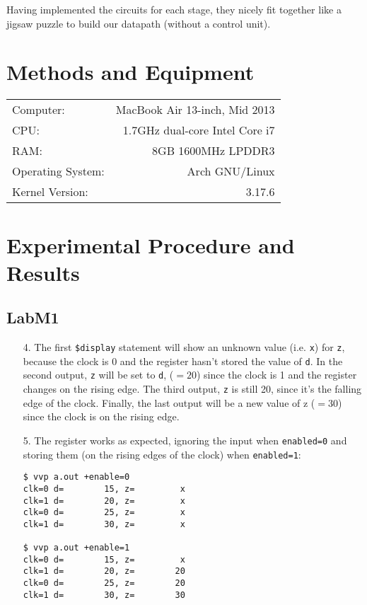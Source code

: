 \documentclass{article}
\begin{document}
Having implemented the circuits for each stage, they nicely fit together like a jigsaw
puzzle to build our datapath (without a control unit).


\section{Methods and Equipment}

\begin{center}
\begin{tabular}{l r}
Computer: & MacBook Air 13-inch, Mid 2013 \\
CPU: & 1.7GHz dual-core Intel Core i7 \\
RAM: & 8GB 1600MHz LPDDR3 \\
Operating System: & Arch GNU/Linux \\
Kernel Version: & 3.17.6
\end{tabular}
\end{center}


\section{Experimental Procedure and Results}

\subsection{LabM1}
\begin{enumerate}
\item[4. ] The first \verb#$display# statement will show an unknown value
(i.e. \verb$x$) for \verb$z$, because the clock is 0 and the register hasn't
stored the value of \verb$d$. In the second output, \verb$z$ will be set to
\verb$d$, ($= 20$) since the clock is 1 and the register changes on the rising
edge. The third output, \verb$z$ is still 20, since it's the falling edge of the
clock. Finally, the last output will be a new value of z ($= 30$) since the clock
is on the rising edge.

\item[5. ] The register works as expected, ignoring the input when \verb$enabled=0$
and storing them (on the rising edges of the clock) when \verb$enabled=1$:
\begin{verbatim}
$ vvp a.out +enable=0
clk=0 d=        15, z=         x
clk=1 d=        20, z=         x
clk=0 d=        25, z=         x
clk=1 d=        30, z=         x

$ vvp a.out +enable=1
clk=0 d=        15, z=         x
clk=1 d=        20, z=        20
clk=0 d=        25, z=        20
clk=1 d=        30, z=        30
\end{verbatim}
\end{enumerate}
\end{document}
